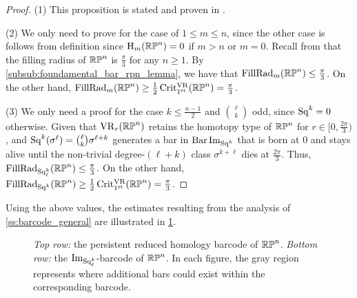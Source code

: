 \begin{proof}
	(1) This proposition is stated and proven in \cite[Thm.~4.5]{adams2022metric}.
  
	(2) We only need to prove for the case of $1\leq m\leq n$, since the other case is follows from definition since \(\mathrm{H}_m(\mathbb{RP}^n) = 0\) if \(m > n\) or \(m = 0\).
	Recall from \cite{katz1983filling} that the filling radius of $\mathbb{RP}^n$ is $\frac{\pi}{3}$ for any $n \geq 1$.
	By \cref{subsub:foundamental_bar_rpn_lemma}, we have that $\operatorname{FillRad}_{m}(\mathbb{RP}^n)\leq \tfrac{\pi}{3}$.
	On the other hand, $\operatorname{FillRad}_{m}(\mathbb{RP}^n)\geq \tfrac{1}{2}\operatorname{Crit^{\mathrm{VR}}_{1^{\mathrm{st}}}}(\mathbb{RP}^n) = \tfrac{\pi}{3}$.

	(3) We only need a proof for the case $k \leq \frac{n-1}{2}$ and $\binom{\ell}{k}$ odd, since \(\operatorname{Sq}^k = 0\) otherwise.
  Given that $\mathrm{VR}_r(\mathbb{RP}^n)$ retains the homotopy type of $\mathbb{RP}^n$ for $r \in [0,\tfrac{2\pi}{3})$,  and $\operatorname{Sq}^k(\sigma^\ell) = \binom{\ell}{k}\sigma^{\ell+k}$ generates a bar in $\operatorname{Bar} \operatorname{Im}_{\operatorname{Sq}^k}$ that is born at $0$ and stays alive until the non-trivial degree-$(\ell+k)$ class $\sigma^{k+\ell}$ dies at $\tfrac{2\pi}{3}$.
	Thus, $\operatorname{FillRad}_{\operatorname{Sq}_\ell^k}(\mathbb{RP}^n) \leq \tfrac{\pi}{3}$.
	On the other hand, $\operatorname{FillRad}_{\operatorname{Sq}^k}(\mathbb{RP}^n) \geq \tfrac{1}{2}\operatorname{Crit^{\mathrm{VR}}_{1^{\mathrm{st}}}}(\mathbb{RP}^n) = \tfrac{\pi}{3}$.
\end{proof}

Using the above values, the estimates resulting from the analysis of \cref{ss:barcode_general} are illustrated in \cref{fig:sq barcodes}.

\begin{figure}
	\centering
	
	\caption{\emph{Top row:} the persistent reduced homology barcode of $\mathbb{RP}^n$.
		\emph{Bottom row:} the $\operatorname{Im}_{\operatorname{Sq}_\ell^k}$-barcode of $\mathbb{RP}^n$.
        In each figure, the gray region represents where additional bars could exist within the corresponding barcode.
	}
	\label{fig:sq barcodes}
\end{figure}
